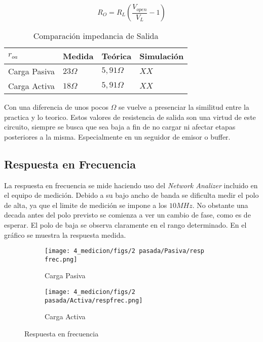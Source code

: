 \begin{equation}
    R_O = R_L(\frac{V_{open}}{V_L}-1)
    \label{eq:zout teor}
\end{equation}

\begin{table}[ht]
    \centering
    \begin{tabular}{|l|l|l|l|}
    \hline
    $r_{oa}$     & Medida     & Teórica         & Simulación \\ \hline
    Carga Pasiva & $23\Omega$ & $5,91\Omega $   &  $XX $          \\ \hline
    Carga Activa & $18\Omega$ &  $5,91\Omega $  &  $XX $          \\ \hline
    \end{tabular}
    \caption{Comparación impedancia de Salida}\label{table:Ro comp}
\end{table}

Con una diferencia de unos pocos $\Omega$ se vuelve a presenciar la similitud entre la practica y lo teorico. Estos valores de resistencia de salida son una virtud de este circuito, siempre se busca que sea baja a fin de no cargar ni afectar etapas posteriores a la misma. Especialmente en un seguidor de emisor o buffer.

\subsection{Respuesta en Frecuencia}

La respuesta en frecuencia se mide haciendo uso del \textit{Network Analizer} incluido en el equipo de medición. Debido a su bajo ancho de banda se dificulta medir el polo de alta, ya que el limite de medición se impone a los $10 MHz$. No obstante una decada antes del polo previsto se comienza a ver un cambio de fase, como es de esperar.
El polo de baja se observa claramente en el rango determinado. En el gráfico \label{fig:resp frec polo} se muestra la respuesta medida.

\begin{figure}[ht]
    \begin{subfigure}{.45\textwidth}
      \centering
      \texttt{[image: 4\_medicion/figs/2 pasada/Pasiva/resp frec.png]}  
      \caption{Carga Pasiva}
      \label{fig:frec carga pasiva}
    \end{subfigure}
    \begin{subfigure}{.45\textwidth}
      \centering
      \texttt{[image: 4\_medicion/figs/2 pasada/Activa/respfrec.png]}  
      \caption{Carga Activa}
      \label{fig:frec carga activa}
    \end{subfigure}
    \caption{Respuesta en frecuencia}
    \label{fig:resp frec oscilo}
    \end{figure}




